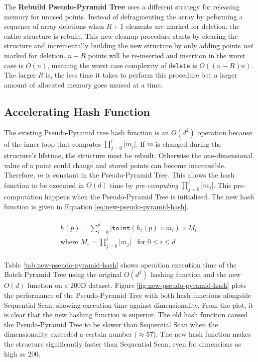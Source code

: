 The \textbf{Rebuild Pseudo-Pyramid Tree} uses a different strategy for releasing memory for unused points. Instead of defragmenting the array by peforming a sequence of array deletions when $R + 1$ elements are marked for deletion, the entire structure is rebuilt. This new cleanup procedure starts by clearing the structure and incrementally building the new structure by only adding points \textit{not} marked for deletion. $n - R$ points will be re-inserted and insertion in the worst case is $O(n)$, meaning the worst case complexity of \texttt{delete} is $O((n - R)n)$. The larger $R$ is, the less time it takes to perform this procedure but a larger amount of allocated memory goes unused at a time.

\subsection{Accelerating Hash Function}

The existing Pseudo-Pyramid tree hash function is an $O(d^2)$ operation because of the inner loop that computes $\prod_{j=0}^{i}{\lbrack m_j \rbrack}$. If $m$ is changed during the structure's lifetime, the structure must be rebuilt. Otherwise the one-dimensional value of a point could change and stored points can become inaccessible. Therefore, $m$ is constant in the Pseudo-Pyramid Tree. This allows the hash function to be executed in $O(d)$ time by \textit{pre-computing} $\prod_{j=0}^{i}{\lbrack m_j \rbrack}$. This pre-computation happens when the Pseudo-Pyramid Tree is initialised. The new hash function is given in Equation \ref{eq:new-pseudo-pyramid-hash}.

\begin{multline}\\
	h(p) = \sum_{i = 0}^{d} { \lbrack \texttt{toInt}( h_i(p) \times m_i ) \times M_i \rbrack } \\
	\text{where } M_i = \prod_{j=0}^{i}{\lbrack m_j \rbrack} \;\;\; \text{for} \; 0 \leq i \leq d \\
	\label{eq:new-pseudo-pyramid-hash}
\end{multline}

Table \ref{tab:new-pseudo-pyramid-hash} shows operation execution time of the Batch Pyramid Tree using the original $O(d^2)$ hashing function and the new $O(d)$ function on a 200D dataset. Figure \ref{fig:new-pseudo-pyramid-hash} plots the performance of the Pseudo-Pyramid Tree with both hash functions alongside Sequential Scan, showing execution time against dimensionality. From the plot, it is clear that the new hashing function is superior. The old hash function caused the Pseudo-Pyramid Tree to be slower than Sequential Scan when the dimensionality exceeded a certain number ($\approx 57$). The new hash function makes the structure significantly faster than Sequential Scan, even for dimensions as high as 200.

